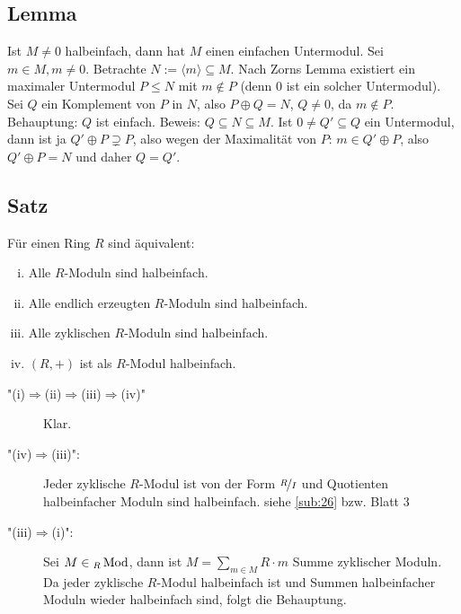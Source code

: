 \subsection[Lemma: Jeder halbeinfache Modul hat einen einfachen Untermodul]{Lemma} %
\label{sub:220}
Ist $M \not= 0$ halbeinfach, dann hat $M$ einen einfachen Untermodul.
Sei $m \in M, m \not= 0$. Betrachte $N := \langle m \rangle \subseteq M$. Nach Zorns Lemma existiert ein maximaler Untermodul $P \le N$ mit $m \not\in P$ (denn $0$ 
ist ein solcher Untermodul). Sei $Q$ ein Komplement von $P$ in $N$, also $P \oplus Q = N$, $Q \not= 0$, da $m \not\in P$. \\
Behauptung: $Q$ ist einfach.  Beweis: $Q \subseteq N \subseteq M$. Ist $0 \not= Q' \subseteq Q$ ein Untermodul, dann ist ja $Q' \oplus P  \supsetneq P$, also wegen der
Maximalität von $P$: $m \in Q' \oplus P$,
also $Q' \oplus P = N$ und daher $Q=Q'$. \bewende

\subsection[Satz: Äquivalenzen zu halbeinfachen $R$-Moduln]{Satz} %
\label{sub:221}
Für einen Ring $R$ sind äquivalent:
\begin{enumerate}[(i)]
	\item Alle $R$-Moduln sind halbeinfach.
	\item Alle endlich erzeugten $R$-Moduln sind halbeinfach.
	\item Alle zyklischen $R$-Moduln sind halbeinfach.
	\item $(R,+)$ ist als $R$-Modul halbeinfach.
\end{enumerate}
\begin{description}
	\item["(i)$\Rightarrow$(ii)$\Rightarrow$(iii)$\Rightarrow$(iv)"] Klar.
	\item["(iv)$\Rightarrow $(iii)":] Jeder zyklische $R$-Modul ist von der Form $\nicefrac{R}{I}$ und Quotienten halbeinfacher Moduln sind halbeinfach. \hfill 
	{\color{light_gray} siehe \ref{sub:26} bzw. Blatt 3}
	\item["(iii)$\Rightarrow$(i)":] Sei $M \in {_R \operatorname{Mod}}$, dann ist $M = \sum_{m \in M} R \cdot m$ Summe zyklischer Moduln. Da jeder zyklische $R$-Modul halbeinfach ist
	und Summen halbeinfacher Moduln wieder halbeinfach sind, folgt die Behauptung. \bewende
\end{description}


